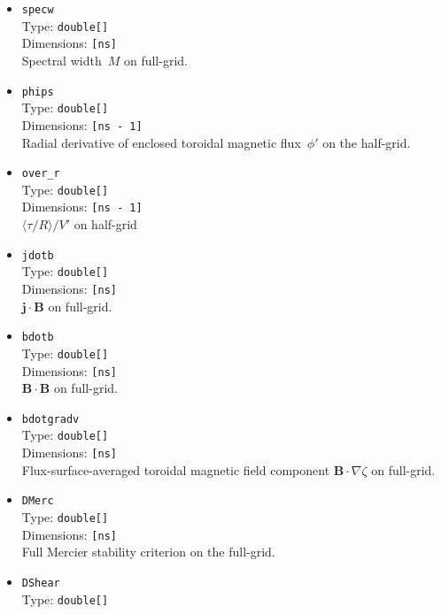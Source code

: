 \begin{itemize}
       Type: \texttt{double[]} \\
       Dimensions: \texttt{[ns]} \\
       Radial force balance residual on full-grid.
 \item \texttt{specw} \\
       Type: \texttt{double[]} \\
       Dimensions: \texttt{[ns]} \\
       Spectral width~$M$ on full-grid.
 \item \texttt{phips} \\
       Type: \texttt{double[]} \\
       Dimensions: \texttt{[ns - 1]} \\
       Radial derivative of enclosed toroidal magnetic flux~$\phi'$ on the half-grid.
 \item \texttt{over\_r} \\
       Type: \texttt{double[]} \\
       Dimensions: \texttt{[ns - 1]} \\
       $\langle \tau / R \rangle / V'$ on half-grid
 \item \texttt{jdotb} \\
       Type: \texttt{double[]} \\
       Dimensions: \texttt{[ns]} \\
       $\mathbf{j} \cdot \mathbf{B}$ on full-grid.
 \item \texttt{bdotb} \\
       Type: \texttt{double[]} \\
       Dimensions: \texttt{[ns]} \\
       $\mathbf{B} \cdot \mathbf{B}$ on full-grid.
 \item \texttt{bdotgradv} \\
       Type: \texttt{double[]} \\
       Dimensions: \texttt{[ns]} \\
       Flux-surface-averaged toroidal magnetic field component $\mathbf{B} \cdot \nabla \zeta$ on full-grid.
 \item \texttt{DMerc} \\
       Type: \texttt{double[]} \\
       Dimensions: \texttt{[ns]} \\
       Full Mercier stability criterion on the full-grid.
 \item \texttt{DShear} \\
       Type: \texttt{double[]} \\

\end{itemize}
